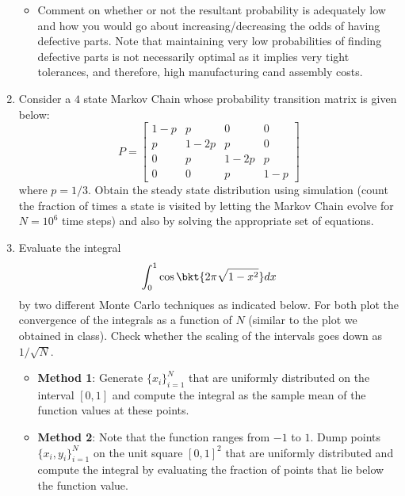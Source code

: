\documentclass{article}
\begin{document}
\begin{enumerate}
\begin{itemize}
			\item
		Comment on whether or not the resultant probability is adequately low and how you would go about increasing/decreasing the odds of having defective parts. Note that maintaining very low probabilities of finding defective parts is not necessarily optimal as it implies very tight tolerances, and therefore, high manufacturing cand assembly costs.
		\end{itemize}
		\item
		Consider a $4$ state Markov Chain whose probability transition matrix is given below:
		$$P = \begin{bmatrix}
		1-p & p & 0 & 0\\
		p & 1-2p & p & 0\\
		0 & p & 1-2p & p\\
		0 & 0 & p & 1-p
		\end{bmatrix}$$
		where $p=1/3$. Obtain the steady state distribution using simulation (count the fraction of times a state is visited by letting the Markov Chain evolve for $N=10^6$ time steps) and also by solving the appropriate set of equations.

		\item
		Evaluate the integral $$\int_0^1 \cos \bkt{2\pi \sqrt{1-x^2}}dx$$ by two different Monte Carlo techniques as indicated below. For both plot the convergence of the integrals as a function of $N$ (similar to the plot we obtained in class). Check whether the scaling of the intervals goes down as $1/\sqrt{N}$.
		\begin{itemize}
			\item
			\textbf{Method 1}: Generate $\{x_i\}_{i=1}^N$ that are uniformly distributed on the interval $[0,1]$ and compute the integral as the sample mean of the function values at these points.
			\item
			\textbf{Method 2}: Note that the function ranges from $-1$ to $1$. Dump points $\{x_i,y_i\}_{i=1}^N$ on the unit square $[0,1]^2$ that are uniformly distributed and compute the integral by evaluating the fraction of points that lie below the function value.
		\end{itemize}
	\end{enumerate}
\end{document}
